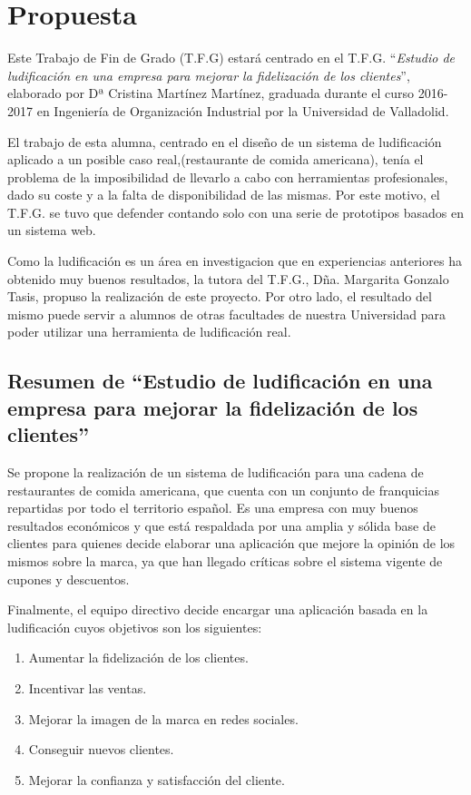 \documentclass[twoside]{report}
\begin{document}
\section{Propuesta}
Este Trabajo de Fin de Grado (T.F.G) estará centrado en el T.F.G. \cite{cristinatfg} “\textit{Estudio de ludificación en una empresa para mejorar la fidelización de los clientes}”, elaborado por Dª Cristina Martínez Martínez, graduada durante el curso 2016-2017 en Ingeniería de Organización Industrial por la Universidad de Valladolid.  

El trabajo de esta alumna, centrado en el diseño de un sistema de ludificación aplicado a un posible caso real,(restaurante de comida americana), tenía el problema de la imposibilidad de llevarlo a cabo con herramientas profesionales, dado su coste y a la falta de disponibilidad de las mismas. Por este motivo, el T.F.G. se tuvo que defender contando solo con una serie de prototipos basados en un sistema web. 

Como la ludificación es un área en investigacion que en experiencias anteriores ha obtenido muy buenos resultados, la tutora del T.F.G., Dña. Margarita Gonzalo Tasis, propuso la realización de este proyecto. Por otro lado, el resultado del mismo puede servir a alumnos de otras facultades de nuestra Universidad para poder utilizar una herramienta de ludificación real.


\subsection{Resumen de “Estudio de ludificación en una empresa para mejorar la fidelización de los clientes”}

Se propone la realización de un sistema de ludificación para una cadena de restaurantes de comida americana, que cuenta con un conjunto de franquicias repartidas por todo el territorio español. Es una empresa con muy buenos resultados económicos y que está respaldada por una amplia y sólida base de clientes para quienes decide elaborar una aplicación que mejore la opinión de los mismos sobre la marca, ya que han llegado críticas sobre el sistema vigente de cupones y descuentos.

Finalmente, el equipo directivo decide encargar una aplicación basada en la ludificación cuyos objetivos son los siguientes:

\begin{enumerate}
\item Aumentar la fidelización de los clientes.
\item Incentivar las ventas.
\item Mejorar la imagen de la marca en redes sociales.
\item Conseguir nuevos clientes.
\item Mejorar la confianza y satisfacción del cliente. 
\end{enumerate}
\end{document}

